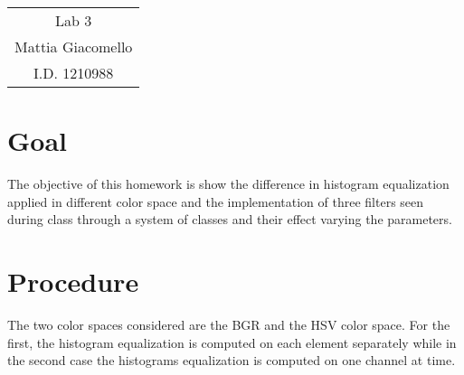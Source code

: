 \documentclass[11pt,a4paper]{article}
\begin{document}
\begin{center}
\begin{tabular}{c}
\LARGE{Lab 3}\\
\large{Mattia Giacomello}\\
I.D. 1210988
\end{tabular}
\end{center}

\section{Goal}
The objective of this homework is show the difference in histogram equalization applied in different color space and the implementation of three filters seen during class through a system of classes and their effect varying the parameters.

\section{Procedure}
The two color spaces considered are the BGR and the HSV color space. \newline 
For the first, the histogram equalization is computed on each element separately while in the second case the histograms equalization is computed on one channel at time.
\end{document}
